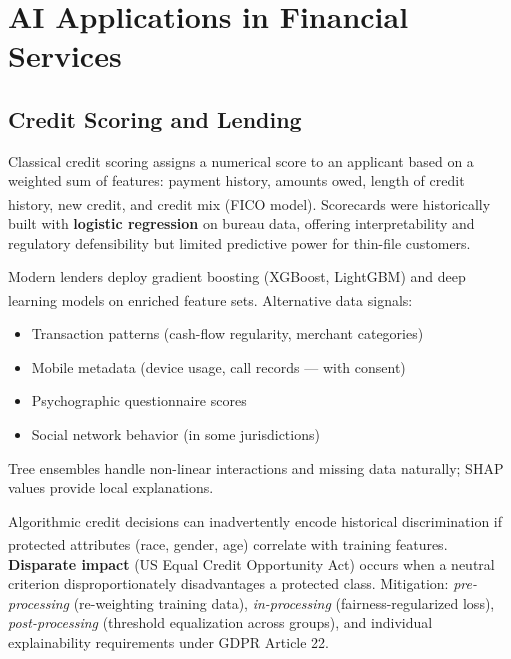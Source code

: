 \section{AI Applications in Financial Services}

\subsection{Credit Scoring and Lending}

\begin{tcbitemize}[ skin=sectionraster ]

    \tcbitem[title=Traditional Credit Scorecards, raster multicolumn=3]
    Classical credit scoring assigns a numerical score to an applicant based on a weighted sum of features: payment history, amounts owed, length of credit history, new credit, and credit mix (FICO model)\textsuperscript{\cite[][p.~149]{jansenMachineLearningAlgorithmic2020}}.
    Scorecards were historically built with \textbf{logistic regression} on bureau data, offering interpretability and regulatory defensibility but limited predictive power for thin-file customers.

    \tcbitem[title=ML-Based Credit Models, raster multicolumn=3]
    Modern lenders deploy gradient boosting (XGBoost, LightGBM) and deep learning models on enriched feature sets\textsuperscript{\cite[][pp.~365--366]{jansenMachineLearningAlgorithmic2020}}.
    Alternative data signals:
    \tcblower
    \begin{itemize}
        \item Transaction patterns (cash-flow regularity, merchant categories)
        \item Mobile metadata (device usage, call records — with consent)
        \item Psychographic questionnaire scores
        \item Social network behavior (in some jurisdictions)
    \end{itemize}
    Tree ensembles handle non-linear interactions and missing data naturally; SHAP values provide local explanations.

    \tcbitem[title={Fairness and Disparate Impact}, raster multicolumn=3]
    Algorithmic credit decisions can inadvertently encode historical discrimination if protected attributes (race, gender, age) correlate with training features\textsuperscript{\cite[][p.~716]{jansenMachineLearningAlgorithmic2020}}.
    \textbf{Disparate impact} (US Equal Credit Opportunity Act) occurs when a neutral criterion disproportionately disadvantages a protected class.
    Mitigation: \emph{pre-processing} (re-weighting training data), \emph{in-processing} (fairness-regularized loss), \emph{post-processing} (threshold equalization across groups), and individual explainability requirements under GDPR Article 22.

\end{tcbitemize}

